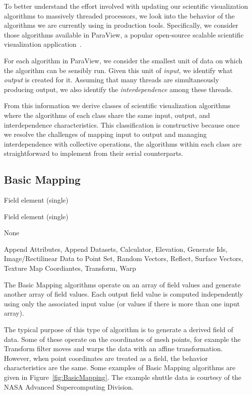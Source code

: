 \documentclass{sig-alternate}
\newcommand*{\lcite}[1]{~\cite{#1}}
\newcommand*{\keyterm}[1]{\emph{#1}}
\newcommand{\algclass}[1]{\textsf{#1}}
\newcommand{\alg}[1]{#1}
\newcommand{\algorithmclasssection}[1]{\subsection*{#1}}
\newcommand{\algorithmclass}[5]{
  \algorithmclasssection{#1} %
  \begin{description}[leftmargin=9em,style=nextline,noitemsep]
    \raggedright
  \item[Input] #2
  \item[Output] #3
  \item[Interdependence] #4
  \item[Algorithms] #5
  \end{description}
}
\begin{document}
\noindent
To better understand the effort involved with updating our scientific
visualization algorithms to massively threaded processors, we look into the
behavior of the algorithms we are currently using in production
tools. Specifically, we consider those algorithms available in ParaView, a
popular open-source scalable scientific visualization
application\lcite{ParaView}.

For each algorithm in ParaView, we consider the smallest unit of data on
which the algorithm can be sensibly run. Given this unit of
\keyterm{input}, we identify what \keyterm{output} is created for
it. Assuming that many threads are simultaneously producing output, we also
identify the \keyterm{interdependence} among these threads.

From this information we derive classes of scientific visualization
algorithms where the algorithms of each class share the same input,
output, and interdependence characteristics. This classification is
constructive because once we resolve the challenges of mapping input to
output and managing interdependence with collective operations, the
algorithms within each class are straightforward to implement from their
serial counterparts.

\algorithmclass{Basic Mapping}
               {Field element (single)} %
               {Field element (single)} %
               {None} %
               {
                 Append Attributes,
                 Append Datasets,
                 Calculator,
                 Elevation,
                 Generate Ids,
                 Image/Rectilinear Data to Point Set,
                 Random Vectors,
                 Reflect,
                 Surface Vectors,
                 Texture Map Coordiantes,
                 Transform,
                 Warp}

\noindent
The \algclass{Basic Mapping} algorithms operate on an array of field values
and generate another array of field values. Each output field value is
computed independently using only the associated input value (or values if
there is more than one input array).

The typical purpose of this type of algorithm is to generate a derived
field of data. Some of these operate on the coordinates of mesh points, for
example the \alg{Transform} filter moves and warps the data with an affine
transformation. However, when point coordinates are treated as a field, the
behavior characteristics are the same. Some examples of \algclass{Basic
  Mapping} algorithms are given in Figure~\ref{fig:BasicMapping}. The
example shuttle data is courtesy of the NASA Advanced Supercomputing
Division.
\end{document}
